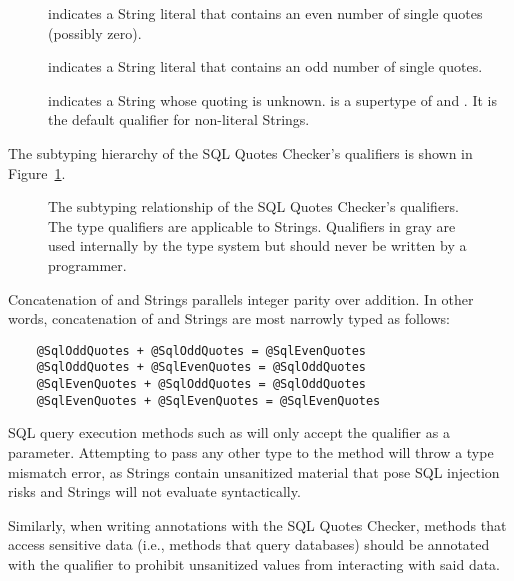 \begin{description}
\item[]
    indicates a String literal that contains an even number of
    single quotes (possibly zero).
\item[]
    indicates a String literal that contains an odd number of single
    quotes.
\item[]
    indicates a String whose quoting is unknown.
     is a supertype of 
    and . It is the default qualifier for non-literal
    Strings.
\end{description}

The subtyping hierarchy of the SQL Quotes Checker's qualifiers is shown in
Figure~\ref{fig-sql-quotes-hierarchy}.

\begin{figure}
\caption{The subtyping relationship of the SQL Quotes Checker's qualifiers.
  The type qualifiers are applicable to Strings. Qualifiers in gray are
  used internally by the type system but should never be written by a programmer.}
\label{fig-sql-quotes-hierarchy}
\end{figure}


Concatenation of  and  Strings parallels
integer parity over addition. In other words, concatenation of 
and  Strings are most narrowly typed as follows:

\begin{verbatim}
    @SqlOddQuotes + @SqlOddQuotes = @SqlEvenQuotes
    @SqlOddQuotes + @SqlEvenQuotes = @SqlOddQuotes
    @SqlEvenQuotes + @SqlOddQuotes = @SqlOddQuotes
    @SqlEvenQuotes + @SqlEvenQuotes = @SqlEvenQuotes
\end{verbatim}

SQL query execution methods such as  will only accept
the  qualifier as a parameter. Attempting to pass any other type to
the method will throw a type mismatch error, as  Strings contain
unsanitized material that pose SQL injection risks and  Strings will not
evaluate syntactically.

Similarly, when writing annotations with the SQL Quotes Checker, methods that access
sensitive data (i.e., methods that query databases) should be annotated with the
 qualifier to prohibit unsanitized values from interacting with
said data.
